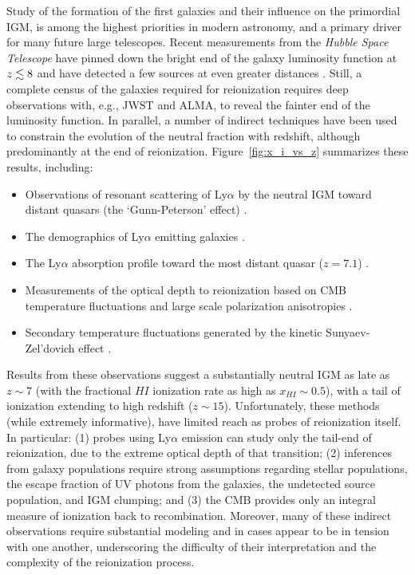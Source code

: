 \documentclass[preprint]{aastex}
\begin{document}
Study of the formation of the first galaxies and their influence on the primordial IGM, is 
among the highest priorities in modern astronomy, 
and a primary driver for many future large telescopes.  Recent measurements from the {\it Hubble Space Telescope} 
have pinned down the bright end of the galaxy luminosity function 
at $z \lesssim 8$ \citep{bouwens_et_al2010, schenker_et_al2013} and have detected a few sources at even greater 
distances \citep{ellis_et_al2013, oesch_et_al2013}. Still, a complete census of the galaxies required for
reionization requires deep observations with, e.g., JWST and ALMA, to reveal the fainter end of the luminosity function. 
In parallel, a number of indirect techniques have been used to constrain the evolution of the neutral fraction
with redshift, although predominantly at the end of reionization. Figure~\ref{fig:x_i_vs_z} summarizes 
these results, including: 

\begin{itemize}[noitemsep,nolistsep]

\item Observations of resonant scattering of Ly$\alpha$ by the neutral IGM toward
distant quasars (the `Gunn-Peterson' effect) \citep{fan_et_al2006}.

\item The demographics of Ly$\alpha$ emitting  galaxies \citep{schenker_et_al2013, treu_et_al2013,Faisst_et_al2014}.

\item The Ly$\alpha$ absorption profile toward the most distant quasar ($z = 7.1$) \citep{bolton_et_al2011}.

\item Measurements of the optical depth to reionization based on CMB temperature fluctuations \citep{planck_et_al2013}
and large scale polarization anisotropies \citep{page_et_al2007}.

\item Secondary temperature fluctuations generated by the kinetic Sunyaev-Zel'dovich effect \citep{zahn_et_al2012, mesinger_et_al2012}. 

\end{itemize}
\noindent
Results from these observations suggest a substantially neutral IGM as late as $z \sim 7$ (with the fractional $HI$ ionization rate as high as $x_{HI} \sim 0.5$), with a tail of ionization extending to high 
redshift ($z \sim 15$).  Unfortunately, these methods (while extremely informative), have limited 
reach as probes of reionization itself. In particular:
(1) probes using Ly$\alpha$ emission can study only the tail-end of reionization, 
due to the extreme optical depth of that transition; (2) inferences from galaxy populations require strong assumptions 
regarding stellar populations, the escape fraction of UV photons from the galaxies, the undetected source population, 
and IGM clumping; and (3) the CMB provides only an integral measure of ionization back to recombination. 
Moreover, many of these indirect observations require substantial modeling and in cases appear to be
in tension with one another, underscoring the difficulty of
their interpretation and the complexity of the reionization process.
\end{document}
